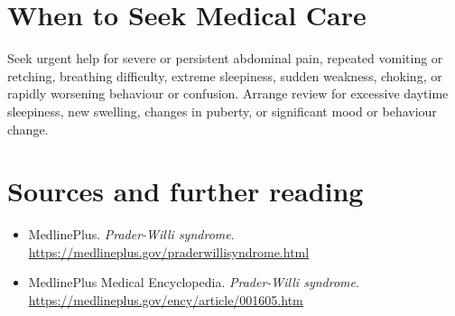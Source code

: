 \section*{When to Seek Medical Care}
Seek urgent help for severe or persistent abdominal pain, repeated vomiting or retching, breathing difficulty, extreme sleepiness, sudden weakness, choking, or rapidly worsening behaviour or confusion. Arrange review for excessive daytime sleepiness, new swelling, changes in puberty, or significant mood or behaviour change.

\section*{Sources and further reading}
\begin{itemize}
\item MedlinePlus. \textit{Prader-Willi syndrome}. \url{https://medlineplus.gov/praderwillisyndrome.html}
\item MedlinePlus Medical Encyclopedia. \textit{Prader-Willi syndrome}. \url{https://medlineplus.gov/ency/article/001605.htm}
\end{itemize}
